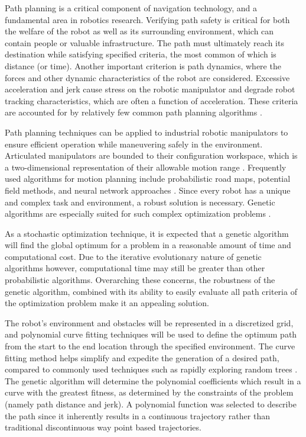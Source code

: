 Path planning is a critical component of navigation technology, and a fundamental area in robotics research. Verifying path safety is critical for both the welfare of the robot as well as its surrounding environment, which can contain people or valuable infrastructure. The path must ultimately reach its destination while satisfying specified criteria, the most common of which is distance (or time). Another important criterion is path dynamics, where the forces and other dynamic characteristics of the robot are considered. Excessive acceleration and jerk cause stress on the robotic manipulator and degrade robot tracking characteristics, which are often a function of acceleration. These criteria are accounted for by relatively few common path planning algorithms \cite{elshamli04}.

Path planning techniques can be applied to industrial robotic manipulators to ensure efficient operation while maneuvering safely in the environment. Articulated manipulators are bounded to their configuration workspace, which is a two-dimensional representation of their allowable motion range \cite{kavraki96}. Frequently used algorithms for motion planning include probabilistic road maps, potential field methods, and neural network approaches \cite{sharir89,khosla88,rimon92,yang00}. Since every robot has a unique and complex task and environment, a robust solution is necessary. Genetic algorithms are especially suited for such complex optimization problems \cite{renner03}.

As a stochastic optimization technique, it is expected that a genetic algorithm will find the global optimum for a problem in a reasonable amount of time and computational cost. Due to the iterative evolutionary nature of genetic algorithms however, computational time may still be greater than other probabilistic algorithms. Overarching these concerns, the robustness of the genetic algorithm, combined with its ability to easily evaluate all path criteria of the optimization problem make it an appealing solution.

The robot's environment and obstacles will be represented in a discretized grid, and polynomial curve fitting techniques will be used to define the optimum path from the start to the end location through the specified environment. The curve fitting method helps simplify and expedite the generation of a desired path, compared to commonly used techniques such as rapidly exploring random trees \cite{rodriguez06}. The genetic algorithm will determine the polynomial coefficients which result in a curve with the greatest fitness, as determined by the constraints of the problem (namely path distance and jerk). A polynomial function was selected to describe the path since it inherently results in a continuous trajectory rather than traditional discontinuous way point based trajectories.

